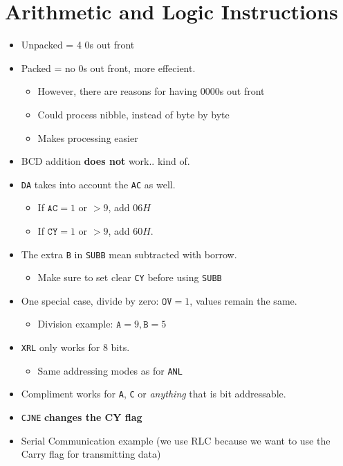 \documentclass[12pt]{article}
\begin{document}
\section{Arithmetic and Logic Instructions}
\begin{itemize}
    \item Unpacked = 4 0s out front
    \item Packed = no 0s out front, more effecient.
    \begin{itemize}
        \item However, there are reasons for having 0000s out front
        \item Could process nibble, instead of byte by byte
        \item Makes processing easier
    \end{itemize}

    \item BCD addition \textbf{does not} work.. kind of.
    \item \texttt{DA} takes into account the \texttt{AC} as well.
    \begin{itemize}
        \item If $\texttt{AC} = 1$ or $> 9$, add $06H$
        \item If $\texttt{CY} = 1$ or $> 9$, add $60H$.
    \end{itemize}

    \item The extra \texttt{B} in \texttt{SUBB} mean subtracted with borrow.
    \begin{itemize}
        \item Make sure to set clear \texttt{CY} before using \texttt{SUBB}
    \end{itemize}

    \item One special case, divide by zero: $\texttt{OV} = 1$, values remain the same.
    \begin{itemize}
        \item Division example: $\texttt{A} = 9, \texttt{B} = 5$
    \end{itemize}

    \item \texttt{XRL} only works for 8 bits.
    \begin{itemize}
        \item Same addressing modes as for \texttt{ANL}
    \end{itemize}

    \item Compliment works for \texttt{A}, \texttt{C} or \textit{anything} that is bit addressable.

    \item \texttt{CJNE} \textbf{changes the CY flag}
    \item Serial Communication example (we use RLC because we want to use the Carry flag for transmitting data)
\end{itemize}
\end{document}
